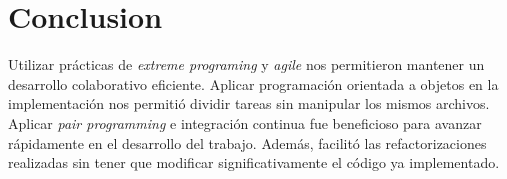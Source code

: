 \documentclass[titlepage,a4paper]{article}
\begin{document}
\section{Conclusion}
\label{sec:org8080052}

Utilizar prácticas de \emph{extreme programing} y \emph{agile} nos permitieron
mantener un desarrollo colaborativo eficiente. Aplicar programación
orientada a objetos en la implementación nos permitió dividir tareas
sin manipular los mismos archivos. Aplicar \emph{pair programming} e
integración continua fue beneficioso para avanzar rápidamente en el
desarrollo del trabajo. Además, facilitó las refactorizaciones
realizadas sin tener que modificar significativamente el código ya
implementado.
\end{document}
